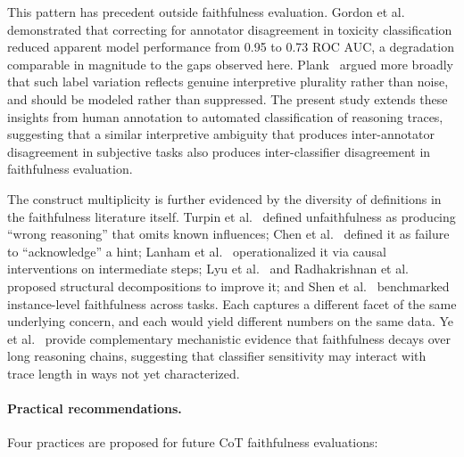 This pattern has precedent outside faithfulness evaluation. Gordon et al.~\cite{gordon2021disagreement} demonstrated that correcting for annotator disagreement in toxicity classification reduced apparent model performance from 0.95 to 0.73 ROC AUC, a degradation comparable in magnitude to the gaps observed here. Plank~\cite{plank2022problem} argued more broadly that such label variation reflects genuine interpretive plurality rather than noise, and should be modeled rather than suppressed. The present study extends these insights from human annotation to automated classification of reasoning traces, suggesting that a similar interpretive ambiguity that produces inter-annotator disagreement in subjective tasks also produces inter-classifier disagreement in faithfulness evaluation.

The construct multiplicity is further evidenced by the diversity of definitions in the faithfulness literature itself. Turpin et al.~\cite{turpin2023unfaithful} defined unfaithfulness as producing ``wrong reasoning'' that omits known influences; Chen et al.~\cite{chen2025reasoning} defined it as failure to ``acknowledge'' a hint; Lanham et al.~\cite{lanham2023measuring} operationalized it via causal interventions on intermediate steps; Lyu et al.~\cite{lyu2023faithful} and Radhakrishnan et al.~\cite{radhakrishnan2023decomposition} proposed structural decompositions to improve it; and Shen et al.~\cite{shen2025faithcotbench} benchmarked instance-level faithfulness across tasks. Each captures a different facet of the same underlying concern, and each would yield different numbers on the same data. Ye et al.~\cite{ye2026faithfulness} provide complementary mechanistic evidence that faithfulness decays over long reasoning chains, suggesting that classifier sensitivity may interact with trace length in ways not yet characterized.

\paragraph{Practical recommendations.} Four practices are proposed for future CoT faithfulness evaluations:

